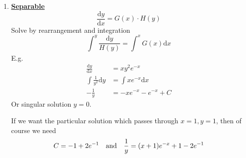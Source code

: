 \documentclass[12pt]{report}
\theoremstyle{definition}
\begin{document}
\begin{enumerate}[label = (\alph*)]
    \item \textbf{\underline{Separable}} \[
            \frac{\mathrm{d}y}{\mathrm{d}x} = G(x) \cdot H(y)
    \] Solve by rearrangement and integration\[
    \int_{}^{y} \frac{\mathrm{d}y}{H(y)} = \int_{}^{x} G(x)\mathrm{d}x
    \]
    E.g. \[
        \begin{align*}
            \frac{\mathrm{d}y}{\mathrm{d}x} & = xy^{2}e^{-x} \\
            \int \frac{1}{y^{2}} \mathrm{d}y & = \int xe^{-x} \mathrm{d}x \\
            -\frac{1}{y} & = -xe^{-x} - e^{-x} + C
        \end{align*}
    \]
    Or singular solution $y = 0$.

    If we want the particular solution which passes through $x = 1, y = 1$, then of course we need \[
        C = -1 + 2e^{-1} \quad \textnormal{and} \quad \frac{1}{y} = (x+1)e^{-x} + 1 - 2e^{-1}
    \]


\end{enumerate}
\end{document}
